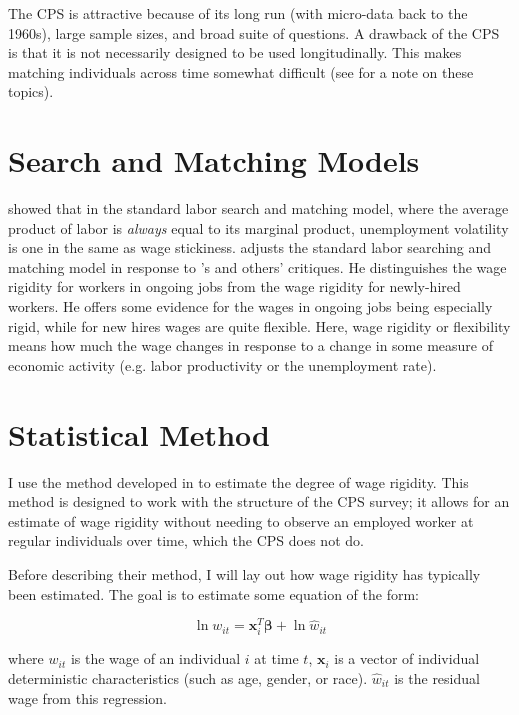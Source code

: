 \documentclass[11pt]{article}
\begin{document}
The CPS is attractive because of its long run (with micro-data back to the 1960s), large sample sizes, and broad suite of questions.
A drawback of the CPS is that it is not necessarily designed to be used longitudinally.
This makes matching individuals across time somewhat difficult (see \cite{madrian1999note} for a note on these topics).

\section{Search and Matching Models}
\label{sec:search_and_matching_models}

\cite{hall_milgrom_2008} showed that in the standard labor search and matching model, where the average product of labor is \emph{always} equal to its marginal product, unemployment volatility is one in the same as wage stickiness.
\cite{pissarides_2009} adjusts the standard labor searching and matching model in response to \cite{shimer_2005}'s and others' critiques.
He distinguishes the wage rigidity for workers in ongoing jobs from the wage rigidity for newly-hired workers.
He offers some evidence for the wages in ongoing jobs being especially rigid, while for new hires wages are quite flexible.
Here, wage rigidity or flexibility means how much the wage changes in response to a change in some measure of economic activity (e.g. labor productivity or the unemployment rate).

\section{Statistical Method}
\label{sec:statistical_method}

I use the method developed in \cite{haefke_sonntag_vanRens_2013} to estimate the degree of wage rigidity.
This method is designed to work with the structure of the CPS survey;
it allows for an estimate of wage rigidity without needing to observe an employed worker at regular individuals over time, which the CPS does not do.

Before describing their method, I will lay out how wage rigidity has typically been estimated.
The goal is to estimate some equation of the form:

\begin{equation}
    \label{eq:individual_wage}
    \ln w_{it} = \boldsymbol{x}_i^{T} \boldsymbol{\beta} + \ln \hat{w}_{it}
\end{equation}

where $w_{it}$ is the wage of an individual $i$ at time $t$, $\boldsymbol{x}_i$ is a vector of individual deterministic characteristics (such as age, gender, or race). $\hat{w}_{it}$ is the residual wage from this regression.
\end{document}
